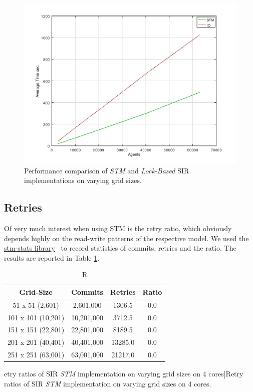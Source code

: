 \begin{figure}
	\centering
	\includegraphics[width=1\textwidth, angle=0]{./fig/concurrentabs/sir/stm_io_varyinggrid_performance.png}
	\caption[Performance comparison of \textit{STM} and \textit{Lock-Based} SIR implementations on varying grid sizes]{Performance comparison of \textit{STM} and \textit{Lock-Based} SIR implementations on varying grid sizes.}
	\label{fig:varyinggrid_constcores}
\end{figure}

\subsection{Retries}
Of very much interest when using STM is the retry ratio, which obviously depends highly on the read-write patterns of the respective model. We used the \href{http://hackage.haskell.org/package/stm-stats}{stm-stats library}~\cite{stm_stats_library} to record statistics of commits, retries and the ratio. The results are reported in Table \ref{tab:retries_stm}.

\begin{table}
	\centering
  	\begin{tabular}{ c || c | c | c }
        Grid-Size 		   & Commits    & Retries & Ratio \\ \hline \hline 
   		51 x 51 (2,601)    & 2,601,000  & 1306.5  & 0.0 \\ \hline
   		101 x 101 (10,201) & 10,201,000 & 3712.5  & 0.0 \\ \hline
   		151 x 151 (22,801) & 22,801,000 & 8189.5  & 0.0 \\ \hline
   		201 x 201 (40,401) & 40,401,000 & 13285.0 & 0.0 \\ \hline 
   		251 x 251 (63,001) & 63,001,000 & 21217.0 & 0.0 \\ \hline \hline
  	\end{tabular}
  	
  	\caption[]Retry ratios of SIR \textit{STM} implementation on varying grid sizes on 4 cores]{Retry ratios of SIR \textit{STM} implementation on varying grid sizes on 4 cores.}
	\label{tab:retries_stm}
\end{table}


